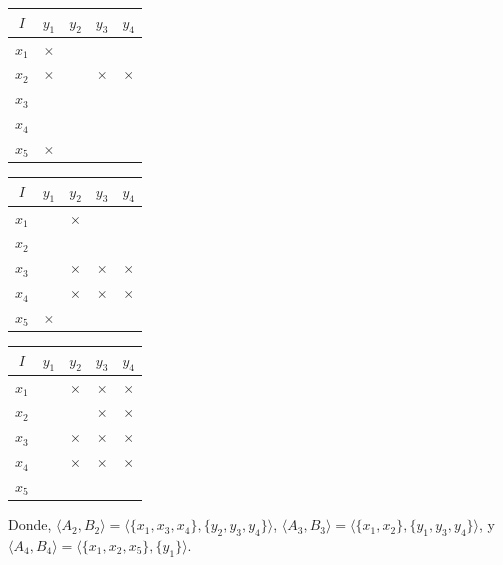 \documentclass[12pt,oneside,letterpaper]{book}
\newcommand{\mycell}[1]{\cellcolor{gray!25}\color{blue}{#1}}
\theoremstyle{definition}
\begin{document}
\begin{table}[h!]
	\centering
	\begin{tabular}{|c|cccc|}
		\hline
		$I$		& $y_1$				& $y_2$ 			& $y_3$ 				& $y_4$ 				\\ \hline
		$x_1$	& $\times$			& \mycell{$\times$}	& \mycell{$\times$} 	& \mycell{$\times$} 	\\
		$x_2$	& $\times$			& 					& $\times$				& $\times$				\\
		$x_3$	& 					& \mycell{$\times$}	& \mycell{$\times$} 	& \mycell{$\times$} 	\\
		$x_4$	& 					& \mycell{$\times$}	& \mycell{$\times$} 	& \mycell{$\times$} 	\\
		$x_5$	& $\times$			& 					& 		 				& 		 				\\
		\hline
	\end{tabular}
	\quad
	\begin{tabular}{|c|cccc|}
		\hline
		$I$		& $y_1$				& $y_2$ 			& $y_3$ 				& $y_4$ 				\\ \hline
		$x_1$	& \mycell{$\times$}	& $\times$			& \mycell{$\times$} 	& \mycell{$\times$} 	\\
		$x_2$	& \mycell{$\times$}	& 					& \mycell{$\times$} 	& \mycell{$\times$} 	\\
		$x_3$	& 					& $\times$			& $\times$ 				& $\times$ 				\\
		$x_4$	& 					& $\times$			& $\times$ 				& $\times$ 				\\
		$x_5$	& $\times$			& 					& 		 				& 		 				\\
		\hline
	\end{tabular}
	\quad
	\begin{tabular}{|c|cccc|}
		\hline
		$I$		& $y_1$				& $y_2$ 			& $y_3$ 				& $y_4$ 				\\ \hline
		$x_1$	& \mycell{$\times$}	& $\times$			& $\times$ 				& $\times$ 				\\
		$x_2$	& \mycell{$\times$}	& 					& $\times$ 				& $\times$ 				\\
		$x_3$	& 					& $\times$			& $\times$ 				& $\times$ 				\\
		$x_4$	& 					& $\times$			& $\times$ 				& $\times$ 				\\
		$x_5$	& \mycell{$\times$}	& 					& 		 				& 		 				\\
		\hline
	\end{tabular}
	\label{tbl:cross_table_highlighted2}
\end{table}

Donde, $\langle A_2,B_2 \rangle = \langle\{x_1,x_3,x_4\}, \{y_2,y_3,y_4\}\rangle$, $\langle A_3,B_3 \rangle = \langle \{x_1,x_2\},\{y_1,y_3,y_4\} \rangle$, y $\langle A_4,B_4 \rangle = \langle \{x_1,x_2,x_5\},\{y_1\} \rangle$.
\end{document}
